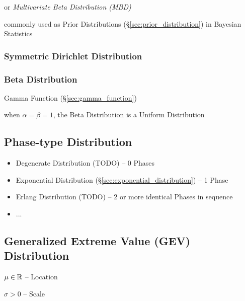 or \emph{Multivariate Beta Distribution (MBD)}

commonly used as Prior Distributions (\S\ref{sec:prior_distribution}) in
Bayesian Statistics



\subsubsection{Symmetric Dirichlet Distribution}\label{sec:symmetric_dirichlet}

\subsubsection{Beta Distribution}\label{sec:beta_distribution}

Gamma Function (\S\ref{sec:gamma_function})

when $\alpha = \beta = 1$, the Beta Distribution is a Uniform Distribution



\subsection{Phase-type Distribution}\label{sec:phasetype_distribution}

\begin{itemize}
  \item Degenerate Distribution (TODO) -- 0
    Phases
  \item Exponential Distribution (\S\ref{sec:exponential_distribution}) -- 1
    Phase
  \item Erlang Distribution (TODO) -- 2 or more identical Phases in sequence
  \item ...
\end{itemize}



\subsection{Generalized Extreme Value (GEV) Distribution}\label{sec:gev}

$\mu \in \mathbb{R}$ -- Location

$\sigma > 0$ -- Scale


